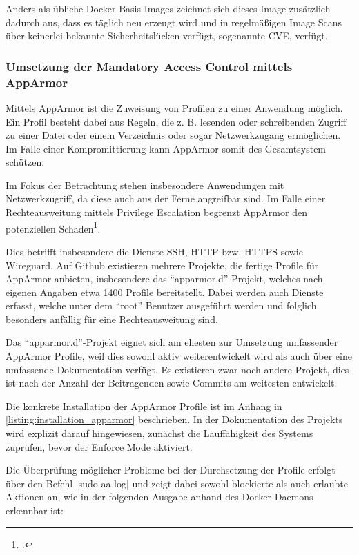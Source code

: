Anders als übliche Docker Basis Images zeichnet sich dieses Image zusätzlich dadurch aus, dass es täglich neu erzeugt wird und in regelmäßigen Image Scans über keinerlei bekannte Sicherheitslücken verfügt, sogenannte \ac{CVE}, verfügt.

\subsubsection{Umsetzung der Mandatory Access Control mittels AppArmor}\label{kap:installation_apparmor}

Mittels AppArmor ist die Zuweisung von Profilen zu einer Anwendung möglich. Ein Profil besteht dabei aus Regeln, die z. B. lesenden oder schreibenden Zugriff zu einer Datei oder einem Verzeichnis oder sogar Netzwerkzugang ermöglichen. Im Falle einer Kompromittierung kann AppArmor somit des Gesamtsystem schützen.

Im Fokus der Betrachtung stehen insbesondere Anwendungen mit Netzwerkzugriff, da diese auch aus der Ferne angreifbar sind. Im Falle einer Rechteausweitung mittels Privilege Escalation begrenzt AppArmor den potenziellen Schaden\footcite[Vgl.][]{hutchinsIntelligenceDrivenComputerNetwork}.

Dies betrifft insbesondere die Dienste \ac{SSH}, \ac{HTTP} bzw. \ac{HTTPS} sowie Wireguard. Auf Github existieren mehrere Projekte, die fertige Profile für AppArmor anbieten, insbesondere das \enquote{apparmor.d}-Projekt, welches nach eigenen Angaben etwa 1400 Profile bereitstellt. Dabei werden auch Dienste erfasst, welche unter dem \enquote{root} Benutzer ausgeführt werden und folglich besonders anfällig für eine Rechteausweitung sind.

Das \enquote{apparmor.d}-Projekt eignet sich am ehesten zur Umsetzung umfassender AppArmor Profile, weil dies sowohl aktiv weiterentwickelt wird als auch über eine umfassende Dokumentation verfügt. Es existieren zwar noch andere Projekt, dies ist nach der Anzahl der Beitragenden sowie Commits am weitesten entwickelt.

Die konkrete Installation der AppArmor Profile ist im Anhang in \autoref{listing:installation_apparmor} beschrieben. In der Dokumentation des Projekts wird explizit darauf hingewiesen, zunächst die Lauffähigkeit des Systems zuprüfen, bevor der Enforce Mode aktiviert.

Die Überprüfung möglicher Probleme bei der Durchsetzung der Profile erfolgt über den Befehl |sudo aa-log|
und zeigt dabei sowohl blockierte als auch erlaubte Aktionen an, wie in der folgenden Ausgabe anhand des Docker Daemons erkennbar ist:

